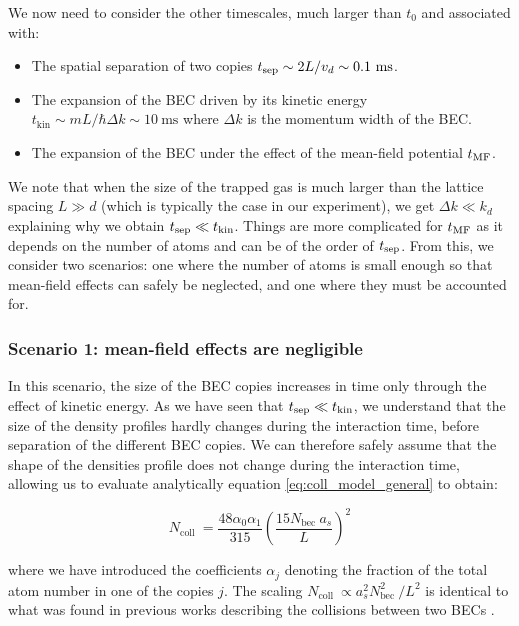 We now need to consider the other timescales, much larger than $t_0$ and associated with:

\begin{itemize}
    \item The spatial separation of two copies $t_{\rm{sep}} \sim 2L/v_d \sim 0.1 \ \rm{ms}$.
    \item The expansion of the BEC driven by its kinetic energy $t_{\mathrm{kin}} \sim m L / \hbar \Delta k \sim 10 \mathrm{~ms}$ where $\Delta k$ is the momentum width of the BEC.
    \item The expansion of the BEC under the effect of the mean-field potential $t_{\rm{MF}}$.
\end{itemize}

\noindent We note that when the size of the trapped gas is much larger than the lattice spacing $L \gg d$ (which is typically the case in our experiment), we get $\Delta k \ll k_d$ explaining why we obtain $t_{\rm{sep}} \ll t_{\rm{kin}}$. Things are more complicated for $t_{\rm{MF}}$ as it depends on the number of atoms and can be of the order of $t_{\rm{sep}}$. From this, we consider two scenarios: one where the number of atoms is small enough so that mean-field effects can safely be neglected, and one where they must be accounted for.

\subsubsection{Scenario 1: mean-field effects are negligible}

In this scenario, the size of the BEC copies increases in time only through the effect of kinetic energy. As we have seen that $t_{\rm{sep}} \ll t_{\rm{kin}}$, we understand that the size of the density profiles hardly changes during the interaction time, \ie before separation of the different BEC copies. We can therefore safely assume that the shape of the densities profile does not change during the interaction time, allowing us to evaluate analytically equation \ref{eq:coll_model_general} to obtain:

\begin{equation}
    N_{\text {coll }}=\frac{48 \alpha_{0} \alpha_{1}}{315}\left(\frac{15 N_{\text {bec }} a_{s}}{L}\right)^{2}
    \label{eq:analytical_model}
\end{equation}

\noindent where we have introduced the coefficients $\alpha_j$ denoting the fraction of the total atom number in one of the copies $j$. The scaling $N_{\text {coll }} \propto a_{s}^{2} N_{\text {bec }}^{2} / L^{2}$ is identical to what was found in previous works describing the collisions between two BECs \cite{zin2005quantum,zin2006elastic}. 

